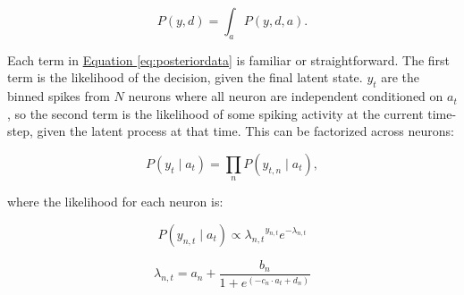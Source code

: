 \documentclass[12pt]{article}
\newcommand{\be}{\begin{equation}}
\newcommand{\ee}{\end{equation}}
\begin{document}
\be
P(y,d) = \int_a P(y,d,a).
\ee

%

Each term in \hyperref[eq:posteriordata]{Equation \ref*{eq:posteriordata}} is familiar or straightforward. The first term is the likelihood of the decision, given the final latent state. $y_t$ are the binned spikes from $N$ neurons where all neuron are independent conditioned on $a_t$, so the second term is the likelihood of some spiking activity at the current time-step, given the latent process at that time. This can be factorized across neurons:

\be
P(y_t \mid a_t) = \prod_{n} P(y_{t,n} \mid a_t),
\ee


where the likelihood for each neuron is:

\be
P(y_{n,t} \mid a_t) \propto {\lambda_{n,t}}^{y_{n,t}} e^{-\lambda_{n,t}}
\ee

\be
\lambda_{n,t} = a_n + \frac{b_n}{1 + e^{(-c_n \cdot a_t + d_n)}}
\ee
\end{document}
